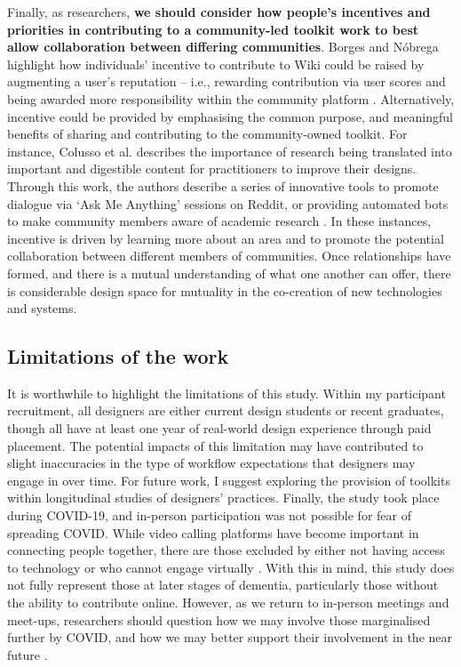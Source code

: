 Finally, as researchers, \textbf{we should consider how people’s incentives and priorities in contributing to a community-led toolkit work to best allow collaboration between differing communities}. Borges and Nóbrega highlight how individuals’ incentive to contribute to Wiki could be raised by augmenting a user’s reputation – i.e., rewarding contribution via user scores and being awarded more responsibility within the community platform \citep{borges2008towards}. Alternatively, incentive could be provided by emphasising the common purpose, and meaningful benefits of sharing and contributing to the community-owned toolkit. For instance, Colusso et al. describes the importance of research being translated into important and digestible content for practitioners to improve their designs. Through this work, the authors describe a series of innovative tools to promote dialogue via ‘Ask Me Anything’ sessions on Reddit, or providing automated bots to make community members aware of academic research \citep{colusso2017translational}.  In these instances, incentive is driven by learning more about an area and to promote the potential collaboration between different members of communities. Once relationships have formed, and there is a mutual understanding of what one another can offer, there is considerable design space for mutuality in the co-creation of new technologies and systems.

\subsection{Limitations of the work}
It is worthwhile to highlight the limitations of this study. Within my participant recruitment, all designers are either current design students or recent graduates, though all have at least one year of real-world design experience through paid placement. The potential impacts of this limitation may have contributed to slight inaccuracies in the type of workflow expectations that designers may engage in over time. For future work, I suggest exploring the provision of toolkits within longitudinal studies of designers’ practices. Finally, the study took place during COVID-19, and in-person participation was not possible for fear of spreading COVID. While video calling platforms have become important in connecting people together, there are those excluded by either not having access to technology or who cannot engage virtually \citep{masoud2021we}. With this in mind, this study does not fully represent those at later stages of dementia, particularly those without the ability to contribute online. However, as we return to in-person meetings and meet-ups, researchers should question how we may involve those marginalised further by COVID, and how we may better support their involvement in the near future \citep{braybrooke2021care}.


